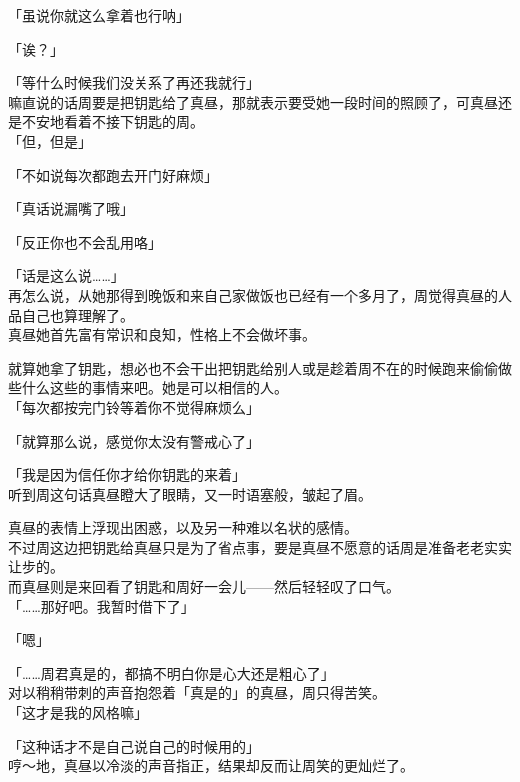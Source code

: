 「虽说你就这么拿着也行呐」

「诶？」

「等什么时候我们没关系了再还我就行」\\

嘛直说的话周要是把钥匙给了真昼，那就表示要受她一段时间的照顾了，可真昼还是不安地看着不接下钥匙的周。\\

「但，但是」

「不如说每次都跑去开门好麻烦」

「真话说漏嘴了哦」

「反正你也不会乱用咯」

「话是这么说……」\\

再怎么说，从她那得到晚饭和来自己家做饭也已经有一个多月了，周觉得真昼的人品自己也算理解了。\\

真昼她首先富有常识和良知，性格上不会做坏事。

就算她拿了钥匙，想必也不会干出把钥匙给别人或是趁着周不在的时候跑来偷偷做些什么这些的事情来吧。她是可以相信的人。\\

「每次都按完门铃等着你不觉得麻烦么」

「就算那么说，感觉你太没有警戒心了」

「我是因为信任你才给你钥匙的来着」\\

听到周这句话真昼瞪大了眼睛，又一时语塞般，皱起了眉。

真昼的表情上浮现出困惑，以及另一种难以名状的感情。\\

不过周这边把钥匙给真昼只是为了省点事，要是真昼不愿意的话周是准备老老实实让步的。\\

而真昼则是来回看了钥匙和周好一会儿——然后轻轻叹了口气。\\

「……那好吧。我暂时借下了」

「嗯」

「……周君真是的，都搞不明白你是心大还是粗心了」\\

对以稍稍带刺的声音抱怨着「真是的」的真昼，周只得苦笑。\\

「这才是我的风格嘛」

「这种话才不是自己说自己的时候用的」\\

哼～地，真昼以冷淡的声音指正，结果却反而让周笑的更灿烂了。\\

